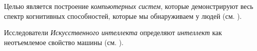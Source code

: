 Целью является построение \textit{компьютерных систем}, которые демонстрируют весь спектр когнитивных способностей, которые мы обнаруживаем у людей (см. ).

Исследователи \textit{Искусственного интеллекта} определяют \textit{интеллект} как неотъемлемое свойство машины (см. ).